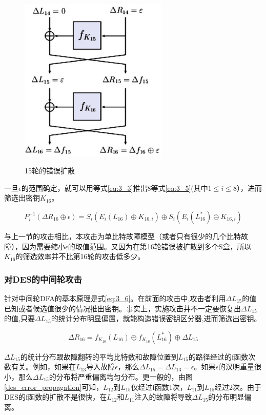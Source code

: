 \documentclass[a4paper,12pt]{article}
\begin{document}
\begin{CJK}{UTF8}{gkai}
\begin{figure}
\centering
\caption{15轮的错误扩散}
\includegraphics[width=200pt]{des_15_round_propagation.jpg}
\label{des_error_propagation_15_round}
\end{figure}

一旦$\epsilon$的范围确定，就可以用等式\ref{eq:3_3}推出8等式\ref{eq:3_5}(其中$1 \leq i \leq 8$），进而筛选出密钥$K_{16}$。

\begin{equation}
\label{eq:3_5}
P_i^{-1}(\Delta R_{16} \oplus \epsilon) = S_i(E_i(L_{16}) \oplus K_{16,i}) \oplus S_i(E_i(L_{16}^*) \oplus K_{16,i})
\end{equation}

与上一节的攻击相比，本攻击为单比特故障模型（或者只有很少的几个比特故障），因为需要缩小$\epsilon$的取值范围。又因为在第16轮错误被扩散到多个S盒，所以$K_{16}$的筛选效率并不比第16轮的攻击低多少。

\subsubsection{对DES的中间轮攻击}
针对中间轮DFA的基本原理是式\ref{eq:3_6}。在前面的攻击中,攻击者利用$\Delta L_{15}$的值已知或者候选值很少的情况推出密钥。事实上，实施攻击并不一定要恢复出$\Delta L_{15}$的值,只要$\Delta L_{15}$的统计分布明显偏置，就能构造错误密钥区分器,进而筛选出密钥。

\begin{equation}
\label{eq:3_6}
\Delta R_{16} = f_{K_{16}}(L_{16}) \oplus f_{K_{16}}(L_{16}^*) \oplus \Delta L_{15}
\end{equation}

$\Delta L_{15}$的统计分布跟故障翻转的平均比特数和故障位置到$L_{15}$的路径经过的f函数次数有关。例如，如果在$L_{13}$导入故障$\epsilon$，那么$\Delta L_{15} = \Delta L_{13} = \epsilon$。如果$\epsilon$的汉明重量很小，那么$\Delta L_{15}$的分布将严重偏离均匀分布。更一般的，由图\ref{des_error_propagation}可知，$L_{12}$到$L_{15}$仅经过f函数1次，$L_{11}$到$L_{15}$经过2次。由于DES的f函数的扩散不是很快，在$L_{12}$和$L_{11}$注入的故障将导致$\Delta L_{15}$的分布明显偏离。


\end{CJK}
\end{document}
